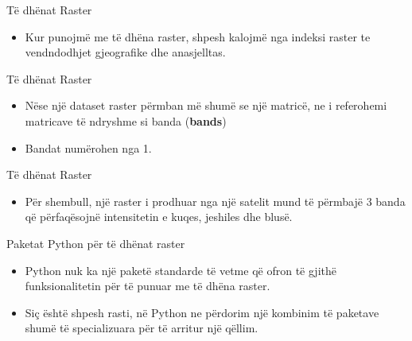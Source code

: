 \documentclass[
  ignorenonframetext,
]{beamer}
\providecommand{\tightlist}{%
  \setlength{\itemsep}{0pt}\setlength{\parskip}{0pt}}
\begin{document}
\begin{frame}{Të dhënat Raster}
\protect\hypertarget{tuxeb-dhuxebnat-raster-4}{}
\begin{itemize}
\tightlist
\item
  Kur punojmë me të dhëna raster, shpesh kalojmë nga indeksi raster te
  vendndodhjet gjeografike dhe anasjelltas.
\end{itemize}
\end{frame}

\begin{frame}{Të dhënat Raster}
\protect\hypertarget{tuxeb-dhuxebnat-raster-5}{}
\begin{itemize}
\item
  Nëse një dataset raster përmban më shumë se një matricë, ne i
  referohemi matricave të ndryshme si banda (\textbf{bands})
\item
  Bandat numërohen nga 1.
\end{itemize}
\end{frame}

\begin{frame}{Të dhënat Raster}
\protect\hypertarget{tuxeb-dhuxebnat-raster-6}{}
\begin{itemize}
\tightlist
\item
  Për shembull, një raster i prodhuar nga një satelit mund të përmbajë 3
  banda që përfaqësojnë intensitetin e kuqes, jeshiles dhe blusë.
\end{itemize}
\end{frame}

\begin{frame}{Paketat Python për të dhënat raster}
\protect\hypertarget{paketat-python-puxebr-tuxeb-dhuxebnat-raster}{}
\begin{itemize}
\item
  Python nuk ka një paketë standarde të vetme që ofron të gjithë
  funksionalitetin për të punuar me të dhëna raster.
\item
  Siç është shpesh rasti, në Python ne përdorim një kombinim të paketave
  shumë të specializuara për të arritur një qëllim.
\end{itemize}
\end{frame}
\end{document}
